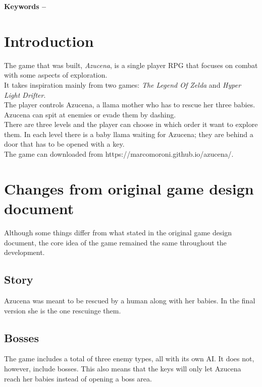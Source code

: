 \documentclass[10pt, a4paper]{article}
\title{\mytitle}
\author{\myauthor\hspace{1em}\\\contact\\Edinburgh Napier University\hspace{0.5em}-\hspace{0.5em}\mymodule}
\date{}
\begin{document}
    \maketitle
    
    \textbf{Keywords -- }{\mykeywords}
    
    \section{Introduction}
    The game that was built, \textit{Azucena}, is a single player RPG that focuses on combat with some aspects of exploration.\\
    It takes inspiration mainly from two games: \textit{The Legend Of Zelda} and \textit{Hyper Light Drifter}.\\
    The player controls Azucena, a llama mother who has to rescue her three babies. Azucena can spit at enemies or evade them by dashing.\\
    There are three levels and the player can choose in which order it want to explore them. In each level there is a baby llama waiting for Azucena; they are behind a door that has to be opened with a key.\\
    The game can downloaded from https://marcomoroni.github.io/azucena/.
    
    \section{Changes from original game design document}
    Although some things differ from what stated in the original game design document, the core idea of the game remained the same throughout the development.
    
    \subsection{Story}
    Azucena was meant to be rescued by a human along with her babies. In the final version she is the one rescuinge them.
    
    \subsection{Bosses}
    The game includes a total of three enemy types, all with its own AI. It does not, however, include bosses. This also means that the keys will only let Azucena reach her babies instead of opening a boss area.
    
\end{document}
